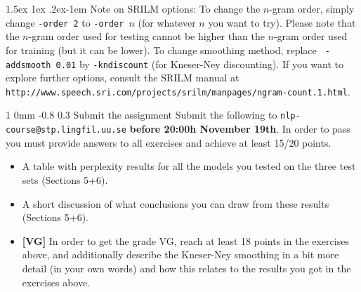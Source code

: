 \documentclass[11pt]{article}
\makeatletter
\newcommand{\newsec}[2]{\section{#1}\label{sec:#2}\noindent}
\renewcommand{\section}{\@startsection
{section}%
{1}%
{0mm}%
{-0.8\baselineskip}%
{0.3\baselineskip}%
{\bfseries\large}}%
\renewcommand{\paragraph}{%
  \@startsection{paragraph}{4}%
  {\z@}{1.5ex \@plus 1ex \@minus .2ex}{-1em}%
  {\normalfont\normalsize\bfseries}%
}\makeatother
\makeatother
\begin{document}
\paragraph{Note on SRILM options:} To change the $n$-gram order,
simply change {\tt -order\,2} to {\tt -order\,$n$} (for whatever $n$
you want to try).  Please note that the $n$-gram order used for
testing cannot be higher than the $n$-gram order used for training
(but it can be lower). To change smoothing method, replace {\tt
  -addsmooth\,0.01} by {\tt -kndiscount} (for Kneser-Ney
discounting). If you want to explore further options, consult the
SRILM manual at {\small {\tt
    http://www.speech.sri.com/projects/srilm/manpages/ngram-count.1.html}}.

\newsec{Submit the assignment}{submit}%
Submit the following to {\tt nlp-course@stp.lingfil.uu.se}
\textbf{before 20:00h November 19th}. In order to pass you must
provide answers to all exercises and achieve at least 15/20 points.

\begin{itemize}[noitemsep,topsep=0.2cm]
\item A table with perplexity results for all the models you tested on
  the three test sets (Sections 5+6).
\item A short discussion of what conclusions you can draw from these
  results (Sections 5+6).
\item \textbf{[VG]} In order to get the grade VG, reach at least 18
  points in the exercises above, and additionally describe the
  Kneser-Ney smoothing in a bit more detail (in your own words) and
  how this relates to the results you got in the exercises above.

\end{itemize}
\end{document}
